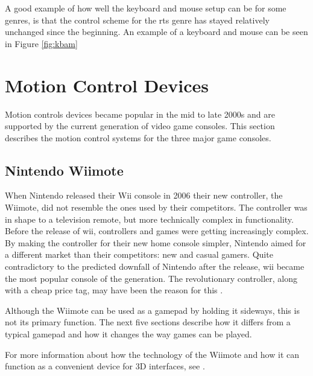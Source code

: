 A good example of how well the keyboard and mouse setup can be for some genres, is that the control scheme for the \gls{rts} genre has stayed relatively unchanged since the beginning. An example of a keyboard and mouse can be seen in Figure \ref{fig:kbam}



\section{Motion Control Devices}
Motion controls devices became popular in the mid to late  2000s and are supported by the current generation of video game consoles. This section describes the motion control systems for the three major game consoles.

\subsection{Nintendo Wiimote}
\label{wiimote}

When Nintendo released their Wii console in 2006 \cite{overmars2012} their new controller, the Wiimote, did not resemble the ones used by their competitors.
The controller was in shape to a television remote, but more technically complex in functionality.
Before the release of \gls{wii}, controllers and games were getting increasingly complex.
By making the controller for their new home console simpler, Nintendo aimed for a different market than their competitors: new and casual gamers.
Quite contradictory to the predicted downfall of Nintendo after the release, \gls{wii} became the most popular console of the generation.
The revolutionary controller, along with a cheap price tag, may have been the reason for this \cite{overmars2012}.

Although the Wiimote can be used as a gamepad by holding it sideways, this is not its primary function. %
The next five sections describe how it differs from a typical gamepad and how it changes the way games can be played. %

For more information about how the technology of the Wiimote and how it can function as a convenient device for 3D interfaces, see \cite{lee2008hacking,wingrave2010wiimote}.

